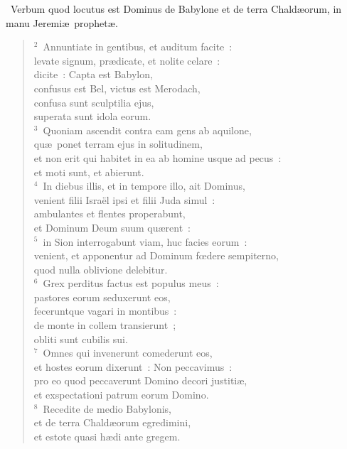 ~Verbum quod locutus est Dominus de Babylone et de terra Chald\ae orum, in manu Jeremi\ae\ prophet\ae .
\begin{flushleft}\begin{verse}\vspace{6pt}${}^{2}$~Annuntiate in gentibus, et auditum facite~:\\ levate signum, pr\ae dicate, et nolite celare~:\\ dicite~: Capta est Babylon,\\ confusus est Bel, victus est Merodach,\\ confusa sunt sculptilia ejus,\\ superata sunt idola eorum.\\
${}^{3}$~Quoniam ascendit contra eam gens ab aquilone,\\ qu\ae\ ponet terram ejus in solitudinem,\\ et non erit qui habitet in ea ab homine usque ad pecus~:\\ et moti sunt, et abierunt.\\
${}^{4}$~In diebus illis, et in tempore illo, ait Dominus,\\ venient filii Isra\"el ipsi et filii Juda simul~:\\ ambulantes et flentes properabunt,\\ et Dominum Deum suum qu\ae rent~:\\
${}^{5}$~in Sion interrogabunt viam, huc facies eorum~:\\ venient, et apponentur ad Dominum fœdere sempiterno,\\ quod nulla oblivione delebitur.\\
${}^{6}$~Grex perditus factus est populus meus~:\\ pastores eorum seduxerunt eos,\\ feceruntque vagari in montibus~:\\ de monte in collem transierunt~;\\ obliti sunt cubilis sui.\\
${}^{7}$~Omnes qui invenerunt comederunt eos,\\ et hostes eorum dixerunt~: Non peccavimus~:\\ pro eo quod peccaverunt Domino decori justiti\ae ,\\ et exspectationi patrum eorum Domino.\\
${}^{8}$~Recedite de medio Babylonis,\\ et de terra Chald\ae orum egredimini,\\ et estote quasi h\ae di ante gregem.\\

\end{verse}
\end{flushleft}
